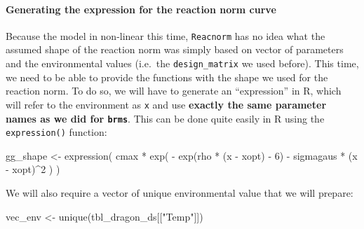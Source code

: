 \documentclass[a4paper,12pt,twoside]{article}
\begin{document}
\paragraph{Generating the expression for the reaction norm curve}
Because the model in non-linear this time, \texttt{Reacnorm} has no idea what the assumed shape of the reaction norm was simply based on vector of parameters and the environmental values (i.e.\ the \texttt{design\_matrix} we used before).
This time, we need to be able to provide the functions with the shape we used for the reaction norm.
To do so, we will have to generate an ``expression'' in R, which will refer to the environment as \texttt{x} and use \textbf{exactly the same parameter names as we did for \texttt{brms}}.
This can be done quite easily in R using the \texttt{expression()} function:
\begin{Rinput}
gg_shape <- expression(
    cmax * exp(
        - exp(rho * (x - xopt) - 6) -
            sigmagaus * (x - xopt)^2
    )
)
\end{Rinput}
We will also require a vector of unique environmental value that we will prepare:
\begin{Rinput}
vec_env <- unique(tbl_dragon_ds[["Temp"]])
\end{Rinput}
\end{document}
